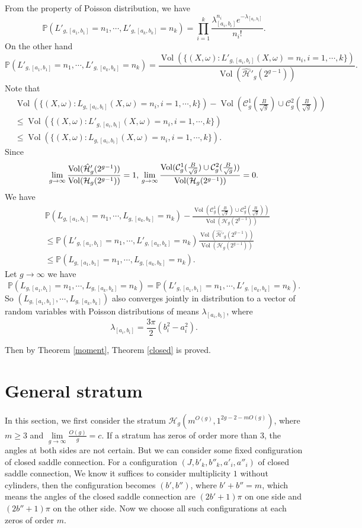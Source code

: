\documentclass[12pt]{amsart} %
\theoremstyle{definition}
\theoremstyle{remark}
\numberwithin{equation}{section}
\renewcommand\H{{\mathcal H}}
\newcommand{\V}{\operatorname{Vol}}
\begin{document}
From the property of Poisson distribution, we have
$$\mathbb{P}(L'_{g,[a_1,b_1]}=n_1,\cdots,L'_{g,[a_k,b_k]}=n_k)=\prod_{i=1}^k\frac{\lambda_{[a_i,b_i]}^{n_i}e^{-\lambda_{[a_i,b_i]}}}{n_i!}.$$
On the other hand 
$$\mathbb{P}(L'_{g,[a_1,b_1]}=n_1,\cdots,L'_{g,[a_k,b_k]}=n_k)=\frac{\V(\{(X,\omega):L'_{g,[a_i,b_i]}(X,\omega)=n_i,i=1,\cdots,k\})}{\V(\hat{\H}'_g(2^{g-1}))}.$$
Note that 
\begin{equation*}
\begin{aligned}
&\V(\{(X,\omega):L_{g,[a_i,b_i]}(X,\omega)=n_i,i=1,\cdots,k\})-
\V(\mathcal{C}_g^{1}(\frac{B}{\sqrt{g}})\cup \mathcal{C}_g^{2}(\frac{B}{\sqrt{g}}))\\ &\leq \V(\{(X,\omega):L'_{g,[a_i,b_i]}(X,\omega)=n_i,i=1,\cdots,k\})\\&\leq
\V(\{(X,\omega):L_{g,[a_i,b_i]}(X,\omega)=n_i,i=1,\cdots,k\}).
\end{aligned}
\end{equation*}
Since
$$\lim_{g\to \infty}\frac{\V(\hat{\H}'_g(2^{g-1}))}{\V(\H_g(2^{g-1}))}=1,\\ \lim_{g\to \infty}\frac{\V(\mathcal{C}_g^{1}(\frac{B}{\sqrt{g}})\cup \mathcal{C}_g^{2}(\frac{B}{\sqrt{g}}))}{\V(\H_g(2^{g-1}))}=0.$$
We have
\begin{equation*}
\begin{aligned}
&\mathbb{P}(L_{g,[a_1,b_1]}=n_1,\cdots,L_{g,[a_k,b_k]}=n_k)-
\frac{\V(\mathcal{C}_g^{1}(\frac{B}{\sqrt{g}})\cup \mathcal{C}_g^{2}(\frac{B}{\sqrt{g}}))}{\V(\H_g(2^{g-1}))}\\ &\leq \mathbb{P}(L'_{g,[a_1,b_1]}=n_1,\cdots,L'_{g,[a_k,b_k]}=n_k)\frac{\V(\hat{\H}'_g(2^{g-1}))}{\V(\H_g(2^{g-1}))}\\&\leq
\mathbb{P}(L_{g,[a_1,b_1]}=n_1,\cdots,L_{g,[a_k,b_k]}=n_k).
\end{aligned}
\end{equation*}
Let $g \to \infty$ we have
$$\mathbb{P}(L_{g,[a_1,b_1]}=n_1,\cdots,L_{g,[a_k,b_k]}=n_k)=\mathbb{P}(L'_{g,[a_1,b_1]}=n_1,\cdots,L'_{g,[a_k,b_k]}=n_k).$$
So $(L_{g,[a_1,b_1]},\cdots,L_{g,[a_k,b_k]})$ also converges jointly in distribution to a vector of random variables 
with Poisson distributions of means $\lambda_{[a_i,b_i]}$, where
$$\lambda_{[a_i,b_i]}=\frac{3\pi}{2}(b_i^2-a_i^2).$$

Then by Theorem \ref{moment}, Theorem \ref{closed} is proved.
\section{General stratum}\label{general case}
In this section, we first consider the stratum $\H_g(m^{O(g)},1^{2g-2-mO(g)})$, where $m\geq 3$ and $\lim\limits_{g\to \infty}\frac{O(g)}{g}=c$.
If a stratum has zeros of order more than $3$, the angles at both sides are not certain. 
But we can consider some fixed configuration of closed saddle connection.
For a configuration $(J,b'_k,b''_k,a'_i,a''_i)$ of closed saddle connection,
We know it suffices to consider multiplicity $1$ without cylinders, then the configuration becomes $(b',b'')$, where $b'+b''=m$, 
which means the angles of the closed saddle connection are $(2b'+1)\pi$ on one side and $(2b''+1)\pi$ on the other side.
Now we choose all such configurations at each zeros of order $m$.
\end{document}
